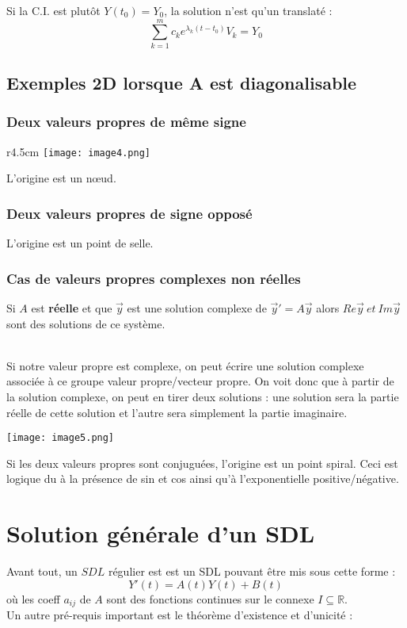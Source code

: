 \documentclass[british,french,11pt, a4paper, openany]{book}
\begin{document}
Si la C.I. est plutôt $Y(t_0) = Y_0$, la solution n'est qu'un translaté :
\begin{equation}
	\sum_{k=1}^m c_k e^{\lambda_k(t-t_0)} V_k = Y_0
\end{equation}
		
		
\setcounter{subsection}{5}
\subsection{Exemples 2D lorsque A est diagonalisable}
\subsubsection{Deux valeurs propres de même signe}
\begin{wrapfigure}[7]{r}{4.5cm}
	\texttt{[image: image4.png]}
\end{wrapfigure}
L'origine est un nœud.
		
\subsubsection{Deux valeurs propres de signe opposé}
L'origine est un point de selle.
		
\subsubsection{Cas de valeurs propres complexes non réelles}
Si $A$ est \textbf{réelle} et que $\vec y$ est une solution complexe de $\vec y' = A\vec y$ alors $Re\vec{y}\ et\ Im\vec{y}$ sont des solutions de ce système.\\ \
		
Si notre valeur propre est complexe, on peut écrire une solution complexe associée à ce groupe valeur propre/vecteur propre. On voit donc que à partir de la solution complexe, on peut en tirer deux solutions : une solution sera la partie réelle de cette solution et l'autre sera simplement la partie imaginaire.
\begin{center}
	\texttt{[image: image5.png]}
\end{center}
Si les deux valeurs propres sont conjuguées, l'origine est un point spiral. Ceci est logique du à la présence de sin et cos ainsi qu'à l'exponentielle positive/négative.
		
		
\setcounter{section}{1}
\section{Solution générale d'un SDL}
Avant tout, un $SDL$ régulier est est un SDL pouvant être mis sous cette forme :
\begin{equation}
	Y'(t) = A(t)Y(t) + B(t)
\end{equation}
où les coeff $a_{ij}$ de $A$ sont des fonctions continues sur le connexe $I\subseteq \mathbb{R}$.\\
Un autre pré-requis important est le théorème d'existence et d'unicité :\\
\end{document}
